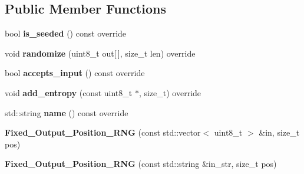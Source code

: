\subsection*{Public Member Functions}
\begin{DoxyCompactItemize}
\item 
\mbox{\label{class_botan___tests_1_1_fixed___output___position___r_n_g_a0551a83aa6ef79845b50231f0b17b4fd}} 
bool {\bfseries is\+\_\+seeded} () const override
\item 
\mbox{\label{class_botan___tests_1_1_fixed___output___position___r_n_g_a7e00602518cb32cac98b9d63f7479a50}} 
void {\bfseries randomize} (uint8\+\_\+t out\mbox{[}$\,$\mbox{]}, size\+\_\+t len) override
\item 
\mbox{\label{class_botan___tests_1_1_fixed___output___position___r_n_g_a7a532fe3427cb9a7764bed64c12d154f}} 
bool {\bfseries accepts\+\_\+input} () const override
\item 
\mbox{\label{class_botan___tests_1_1_fixed___output___position___r_n_g_a5628431900bedf2effcb8c90623c3b6b}} 
void {\bfseries add\+\_\+entropy} (const uint8\+\_\+t $\ast$, size\+\_\+t) override
\item 
\mbox{\label{class_botan___tests_1_1_fixed___output___position___r_n_g_a906802f5ba6e0e519bba160462ab40fa}} 
std\+::string {\bfseries name} () const override
\item 
\mbox{\label{class_botan___tests_1_1_fixed___output___position___r_n_g_abd09076c8d049f94bdd0f6eaafad3b08}} 
{\bfseries Fixed\+\_\+\+Output\+\_\+\+Position\+\_\+\+R\+NG} (const std\+::vector$<$ uint8\+\_\+t $>$ \&in, size\+\_\+t pos)
\item 
\mbox{\label{class_botan___tests_1_1_fixed___output___position___r_n_g_ac1effe97fc42913cf5b1f87d87c4c508}} 
{\bfseries Fixed\+\_\+\+Output\+\_\+\+Position\+\_\+\+R\+NG} (const std\+::string \&in\+\_\+str, size\+\_\+t pos)
\end{DoxyCompactItemize}
